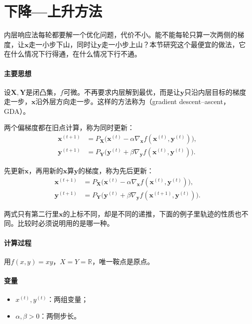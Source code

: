 \section{下降—上升方法}
\label{sec:minimax-gda}

内层响应法每轮都要解一个优化问题，代价不小。能不能每轮只算一次两侧的梯度，让$\bm{x}$走一小步下山，同时让$\bm{y}$走一小步上山？本节研究这个最便宜的做法，它在什么情况下行得通，在什么情况下行不通。

\paragraph{主要思想}
设$\bm{X},\bm{Y}$是闭凸集，$f$可微。不再要求内层解到最优，而是让$\bm{y}$只沿内层目标的梯度走一步，$\bm{x}$沿外层方向走一步。这样的方法称为（gradient descent--ascent，GDA）。

两个偏梯度都在旧点计算，称为同时更新：
\begin{equation}
 \begin{aligned}
 \bm{x}^{(t+1)}&=P_{\bm{X}}\bigl(\bm{x}^{(t)}-\alpha\nabla_{\bm{x}}f(\bm{x}^{(t)},\bm{y}^{(t)})\bigr),\\
 \bm{y}^{(t+1)}&=P_{\bm{Y}}\bigl(\bm{y}^{(t)}+\beta\nabla_{\bm{y}}f(\bm{x}^{(t)},\bm{y}^{(t)})\bigr).
 \end{aligned}
 \label{eq:minimax-gda-sim}
\end{equation}

先更新$\bm{x}$，再用新的$\bm{x}$算$\bm{y}$的梯度，称为先后更新：
\begin{equation}
 \begin{aligned}
 \bm{x}^{(t+1)}&=P_{\bm{X}}\bigl(\bm{x}^{(t)}-\alpha\nabla_{\bm{x}}f(\bm{x}^{(t)},\bm{y}^{(t)})\bigr),\\
 \bm{y}^{(t+1)}&=P_{\bm{Y}}\bigl(\bm{y}^{(t)}+\beta\nabla_{\bm{y}}f(\bm{x}^{(t+1)},\bm{y}^{(t)})\bigr).
 \end{aligned}
 \label{eq:minimax-gda-alt}
\end{equation}

两式只有第二行里$\bm{x}$的上标不同，却是不同的递推，下面的例子里轨迹的性质也不同。比较时必须说明用的是哪一种。

\paragraph{计算过程}
用$f(x,y)=xy$，$X=Y=\mathbb{R}$，唯一鞍点是原点。

\paragraph{变量}
\begin{itemize}
 \item $x^{(t)},y^{(t)}$：两组变量；
 \item $\alpha,\beta>0$：两侧步长。
\end{itemize}

